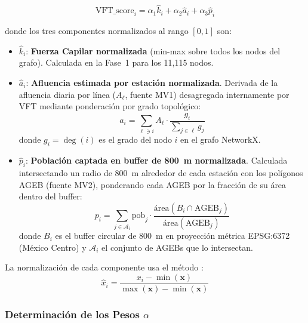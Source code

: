 \begin{equation}
    \text{VFT\_score}_i = \alpha_1 \hat{k}_i + \alpha_2 \hat{a}_i + \alpha_3 \hat{p}_i
    \label{eq:vft-score}
\end{equation}

donde los tres componentes normalizados al rango $[0, 1]$ son:

\begin{itemize}
    \item $\hat{k}_i$: \textbf{Fuerza Capilar normalizada} (min-max sobre todos
    los nodos del grafo). Calculada en la Fase~1 para los 11{,}115 nodos.
    \item $\hat{a}_i$: \textbf{Afluencia estimada por estación normalizada}.
    Derivada de la afluencia diaria por línea ($A_\ell$, fuente MV1) desagregada
    internamente por VFT mediante ponderación por grado topológico:
    \begin{equation}
        a_i = \sum_{\ell \ni i} A_\ell \cdot
        \frac{g_i}{\displaystyle\sum_{j \in \ell} g_j}
        \label{eq:desagregacion-afluencia}
    \end{equation}
    donde $g_i = \deg(i)$ es el grado del nodo $i$ en el grafo NetworkX.
    \item $\hat{p}_i$: \textbf{Población captada en buffer de 800~m normalizada}.
    Calculada intersectando un radio de 800~m alrededor de cada estación con los
    polígonos AGEB (fuente MV2), ponderando cada AGEB por la fracción de su área
    dentro del buffer:
    \begin{equation}
        p_i = \sum_{j \in \mathcal{A}_i} \text{pob}_j \cdot
        \frac{\text{área}(B_i \cap \text{AGEB}_j)}{\text{área}(\text{AGEB}_j)}
        \label{eq:poblacion-captada}
    \end{equation}
    donde $B_i$ es el buffer circular de 800~m en proyección métrica EPSG:6372
    (México Centro) y $\mathcal{A}_i$ el conjunto de AGEBs que lo intersectan.
\end{itemize}

La normalización de cada componente usa el método :
\begin{equation}
    \hat{x}_i = \frac{x_i - \min(\mathbf{x})}{\max(\mathbf{x}) - \min(\mathbf{x})}
    \label{eq:normalizacion-minmax}
\end{equation}

\subsubsection{Determinación de los Pesos \texorpdfstring{$\alpha$}{\textalpha}}
\label{subsubsec:pesos-alpha}

